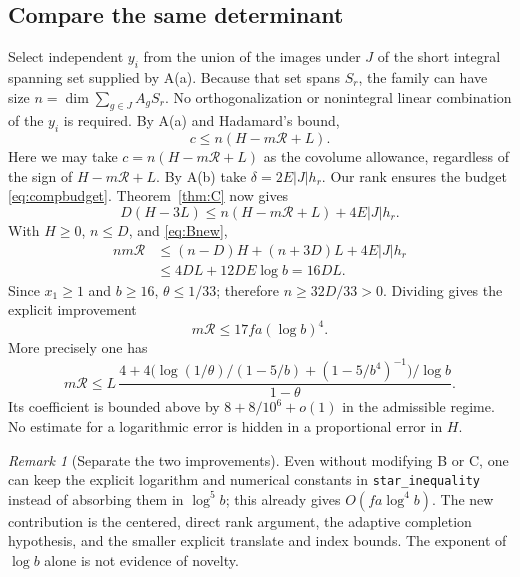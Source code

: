 \documentclass[11pt]{article}
\theoremstyle{remark}\newtheorem{remark}[theorem]{Remark}
\newcommand{\R}{\mathcal R}
\begin{document}
\subsection{Compare the same determinant}
Select independent $y_i$ from the union of the images under $J$ of the short integral spanning set supplied by A(a). Because that set spans $S_r$, the family can have size $n=\dim\sum_{g\in J} A_g S_r$. No orthogonalization or nonintegral linear combination of the $y_i$ is required. By A(a) and Hadamard's bound,
\[
c\le n(H-m\R+L).
\]
Here we may take $c=n(H-m\R+L)$ as the covolume allowance, regardless of the sign of $H-m\R+L$. By A(b) take $\delta=2E|J|h_r$. Our rank ensures the budget \eqref{eq:compbudget}. Theorem~\ref{thm:C} now gives
\[
D(H-3L)\le n(H-m\R+L)+4E|J|h_r.
\]
With $H\ge0$, $n\le D$, and \eqref{eq:Bnew},
\begin{align*}
nm\R&\le(n-D)H+(n+3D)L+4E|J|h_r\\
&\le4DL+12DE\log b=16DL.
\end{align*}
Since $x_1\ge1$ and $b\ge16$, $\theta\le1/33$; therefore $n\ge32D/33>0$. Dividing gives the explicit improvement
\begin{equation}\label{eq:starnew}
\boxed{m\R\le17fa(\log b)^4.}
\end{equation}
More precisely one has
\begin{equation}\label{eq:starsharp}
m\R\le L\,\frac{4+4\bigl(\log(1/\theta)/(1-5/b)+(1-5/b^4)^{-1}\bigr)/\log b}{1-\theta}.
\end{equation}
Its coefficient is bounded above by $8+8/10^6+o(1)$ in the admissible regime. No estimate for a logarithmic error is hidden in a proportional error in $H$.

\begin{remark}[Separate the two improvements]
Even without modifying B or C, one can keep the explicit logarithm and numerical constants in \texttt{star\_inequality} instead of absorbing them in $\log^5 b$; this already gives $O(fa\log^4 b)$. The new contribution is the centered, direct rank argument, the adaptive completion hypothesis, and the smaller explicit translate and index bounds. The exponent of $\log b$ alone is not evidence of novelty.
\end{remark}
\end{document}
